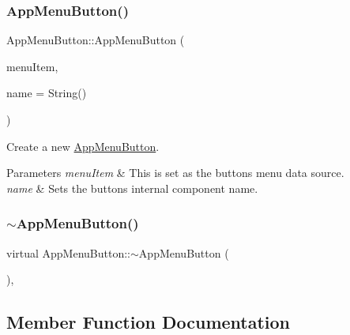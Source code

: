 \subsubsection{\texorpdfstring{App\+Menu\+Button()}{AppMenuButton()}}
{\footnotesize\ttfamily App\+Menu\+Button\+::\+App\+Menu\+Button (\begin{DoxyParamCaption}\item[{\mbox{\hyperlink{classAppMenuItem_ab5f51c5d74f8df62b8862c0cc8126cb7}{App\+Menu\+Item\+::\+Ptr}}}]{menu\+Item,  }\item[{String}]{name = {\ttfamily String()} }\end{DoxyParamCaption})}

Create a new \mbox{\hyperlink{classAppMenuButton}{App\+Menu\+Button}}.


\begin{DoxyParams}{Parameters}
{\em menu\+Item} & This is set as the button\textquotesingle{}s menu data source.\\
\hline
{\em name} & Sets the button\textquotesingle{}s internal component name. \\
\hline
\end{DoxyParams}
\mbox{\label{classAppMenuButton_aaf609655fb3b0f5d7a14ba82b7339929}} 
\subsubsection{\texorpdfstring{$\sim$\+App\+Menu\+Button()}{~AppMenuButton()}}
{\footnotesize\ttfamily virtual App\+Menu\+Button\+::$\sim$\+App\+Menu\+Button (\begin{DoxyParamCaption}{ }\end{DoxyParamCaption})\hspace{0.3cm}{\ttfamily [inline]}, {\ttfamily [virtual]}}



\subsection{Member Function Documentation}
\mbox{\label{classAppMenuButton_ad89d44c5aacdb80c10af0259e6502b27}} 
